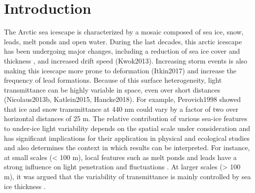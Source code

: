 \section{Introduction}
The Arctic sea icescape is characterized by a mosaic composed of sea ice, snow, leads, melt ponds and open water. During the last decades, this arctic icescape has been undergoing major changes, including a reduction of sea ice cover and thickness \citep{Meier2014}, and increased drift speed (Kwok2013). Increasing storm events is also making this icescape more prone to deformation (Itkin2017) and increase the frequency of lead formations. Because of this surface heterogeneity, light transmittance can be highly variable in space, even over short distances (Nicolaus2013b, Katlein2015, Hancke2018). For example, Perovich1998 showed that ice and snow transmittance at 440 nm could vary by a factor of two over horizontal distances of 25 m. The relative contribution of various sea-ice features to under-ice light variability depends on the spatial scale under consideration and has significant implications for their application in physical and ecological studies and also determines the context in which results can be interpreted. For instance, at small scales (< 100 m), local features such as melt ponds and leads have a strong influence on light penetration and fluctuations \citep{Frey2011, Katlein2016, Massicotte2018}. At larger scales (> 100 m), it was argued that the variability of transmittance is mainly controlled by sea ice thickness \citep{Katlein2015}.